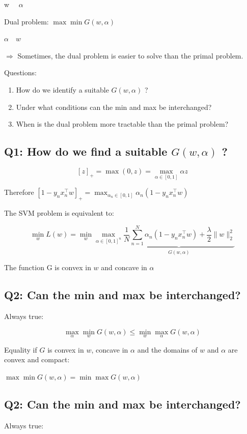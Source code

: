 w $\quad \alpha$

Dual problem: $\max \min G(w, \alpha)$

$\alpha \quad w$

$\Rightarrow$ Sometimes, the dual problem is easier to solve than the primal problem.

Questions:

\begin{enumerate}
  \item How do we identify a suitable $G(w, \alpha)$ ?

  \item Under what conditions can the min and max be interchanged?

  \item When is the dual problem more tractable than the primal problem?

\end{enumerate}

\subsection*{Q1: How do we find a suitable $G(w, \alpha)$ ?}
$$
[z]_{+}=\max (0, z)=\max _{\alpha \in[0,1]} \alpha z
$$

Therefore $\left[1-y_{n} x_{n}^{\top} w\right]_{+}=\max _{\alpha_{n} \in[0,1]} \alpha_{n}\left(1-y_{n} x_{n}^{\top} w\right)$

The SVM problem is equivalent to:

$$
\min _{w} L(w)=\min _{w} \max _{\alpha \in[0,1]^{n}} \underbrace{\frac{1}{N} \sum_{n=1}^{N} \alpha_{n}\left(1-y_{n} x_{n}^{\top} w\right)+\frac{\lambda}{2}\|w\|_{2}^{2}}_{G(w, \alpha)}
$$

The function $\mathrm{G}$ is convex in $w$ and concave in $\alpha$

\subsection*{Q2: Can the min and max be interchanged?}
Always true:

$$
\max _{\alpha} \min _{w} G(w, \alpha) \leq \min _{w} \max _{\alpha} G(w, \alpha)
$$

Equality if $G$ is convex in $w$, concave in $\alpha$ and the domains of $w$ and $\alpha$ are convex and compact:

$\max \min G(w, \alpha)=\min \max G(w, \alpha)$


\subsection*{Q2: Can the min and max be interchanged?}
Always true:

